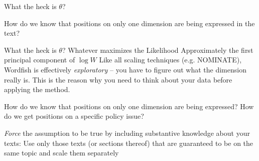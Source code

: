 \documentclass[kp]{foilpack}
\begin{document}
%
%




What the heck is $\theta$?

How do we know that positions on only one dimension are being expressed in the text?


What the heck is $\theta$?
\ita
\itm Whatever maximizes the Likelihood
\itm Approximately the first principal component of $\log W$ 
\itz
Like all scaling techniques (e.g. NOMINATE), Wordfish is effectively \textit{exploratory} -- you have to figure out what the dimension really is. This is the reason why you need to think about your data before applying the method.



How do we know that positions on only one dimension are being expressed? How do we get positions on a specific policy issue?

\textit {Force} the assumption to be true by including substantive knowledge about your texts:
\ita
\itm Use only those texts (or sections thereof)  that are guaranteed to be on the same topic and scale them separately 
\end{document}
